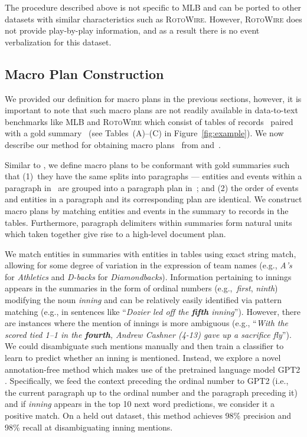 \documentclass[11pt,a4paper]{article}
\begin{document}
The procedure described above is not specific to MLB and can be ported
to other datasets with similar characteristics such as
\textsc{RotoWire}.  However, \textsc{RotoWire} does not provide
play-by-play information, and as a result there is no event
verbalization for this dataset.


\subsection{Macro Plan Construction} 
\label{sec:macro-plan-constr}

We provided our definition for macro plans in the previous sections,
however, it is important to note that such macro plans are not readily
available in data-to-text benchmarks like MLB
\cite{puduppully-etal-2019-data} and \textsc{RotoWire}
\cite{wiseman-etal-2017-challenges} which consist of tables of
records~ paired with a gold summary~ (see Tables~(A)--(C) in
Figure~\ref{fig:example}). We now describe our method for obtaining
macro plans~ from  and~. 

Similar to \citet{moryossef-etal-2019-step}, we define macro plans to
be conformant with gold summaries such that (1)~they have the same
splits into paragraphs --- entities and events within a paragraph
in~ are grouped into a paragraph plan in~; and (2) the order of
events and entities in a paragraph and its corresponding plan are
identical.  We construct macro plans by matching entities and events
in the summary to records in the tables. Furthermore, paragraph
delimiters within summaries form natural units which taken together
give rise to a high-level document plan.

We match entities in summaries with entities in tables using exact
string match, allowing for some degree of variation in the expression
of team names (e.g., \textsl{A's} for \textsl{Athletics} and
\textsl{D-backs} for \textsl{Diamondbacks}).  Information pertaining
to innings appears in the summaries in the form of ordinal numbers
(e.g.,~\textsl{first}, \textsl{ninth}) modifying the noun
\textsl{inning} and can be relatively easily identified via pattern
matching (e.g., in sentences like ``\textsl{Dozier led off the
  \textbf{fifth} inning}''). However, there are instances where the
mention of innings is more ambiguous (e.g., ``\textsl{With the scored
  tied 1--1 in the \textbf{fourth}, Andrew Cashner (4-13) gave up a
  sacrifice fly}'').  We could disambiguate such mentions manually and
then train a classifier to learn to predict whether an inning is
mentioned.  Instead, we explore a novel annotation-free method which
makes use of the pretrained language model GPT2
\cite{Radford2019LanguageMA}.  Specifically, we feed the context
preceding the ordinal number to GPT2 (i.e., the current paragraph up
to the ordinal number and the paragraph preceding it) and if
\textsl{inning} appears in the top 10 next word predictions, we
consider it a positive match. On a held out dataset, this method
achieves 98\% precision and 98\% recall at disambiguating inning
mentions.
\end{document}
